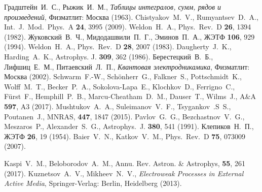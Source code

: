 \documentclass[cp1251%
               ]{jetp} %
\begin{document}
\begin{references}
%
Градштейн~И.~С.,  Рыжик~И.~М., {\it Таблицы интегралов, сумм, рядов и
   произведений}, Физматлит: Москва (1963). 
%
Chistyakov~M.~V., Rumyantsev~D.~A., 
   Int.~J.~Mod.~Phys.~A {\bf 24}, 3995 (2009).
%
Weldon~H.~A., Phys.~Rev.~D {\bf 26}, 1394 (1982).
%
Жуковский~В.~Ч., Мидодашвили~П.~Г., Эминов~П.~А., ЖЭТФ {\bf 106}, 929 (1994). 
%
Weldon~H.~A., Phys.~Rev.~D {\bf 28}, 2007 (1983).
%
Daugherty~J.~K., Harding~A.~K., Astrophys. J. {\bf 309}, 362 (1986).
%
Берестецкий~В.~Б., Лифшиц~Е.~М., Питаевский~Л.~П., {\it Квантовая электродникамика}, Физматлит: Москва (2002). 
%
Schwarm~F.-W.,  Sch{\"o}nherr~G.,  Falkner~S.,  Pottschmidt~K., Wolff~M.~T., Becker~P.~A., Sokolova-Lapa~E., Klochkov~D., Ferrigno~C., F{\"u}rst~F., Hemphill~P.~B., Marcu-Cheatham~D.~M., Dauser~T., Wilms~J., A{\&}A {\bf 597}, A3 (2017).
%
Mushtukov~A.~A., Suleimanov~V.~F., Tsygankov~.S~S., Poutanen~J., MNRAS, {\bf 447}, 1847 (2015).
%
Pavlov~G.~G., Bezchastnov~V.~G., Meszaros~P., Alexander~S.~G.,   
   Astrophys.~J. {\bf 380}, 541 (1991).
%
Клепиков~Н.~П., 
  ЖЭТФ \textbf{26}, 19 (1954).
%
Baier~V.~N., Katkov~V.~M., Phys.~Rev.~D {\bf 75}, 073009 (2007).

%
Kaspi~V.~M., Beloborodov~A.~M., Annu. Rev. Astron. \& Astrophys, {\bf 55}, 261 (2017).
%
Kuznetsov~A.~V., Mikheev~N.~V.,
   {\it Electroweak Processes in External Active Media}, 
   Springer-Verlag: Berlin, Heidelberg (2013).
   

\end{references}
\end{document}
